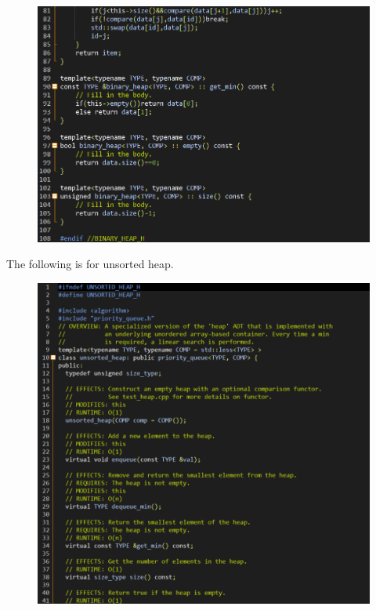 \documentclass[12pt]{article}
\begin{document}
\begin{figure}[H]
\centering
\includegraphics[scale=0.6]{P9.png}
\end{figure}
The following is for unsorted heap.
\begin{figure}[H]
\centering
\includegraphics[scale=0.6]{P10.png}
\end{figure}
\end{document}
